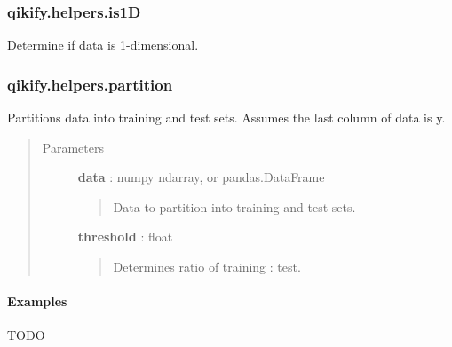 \documentclass[letterpaper,10pt,english]{sphinxmanual}
\begin{document}
\subsubsection{qikify.helpers.is1D}
\label{generated/qikify.helpers.is1D:qikify-helpers-is1d}\label{generated/qikify.helpers.is1D::doc}

\begin{fulllineitems}
\label{generated/qikify.helpers.is1D:qikify.helpers.is1D}
Determine if data is 1-dimensional.

\end{fulllineitems}



\subsubsection{qikify.helpers.partition}
\label{generated/qikify.helpers.partition:qikify-helpers-partition}\label{generated/qikify.helpers.partition::doc}

\begin{fulllineitems}
\label{generated/qikify.helpers.partition:qikify.helpers.partition}
Partitions data into training and test sets. Assumes the last column of
data is y.
\begin{quote}\begin{description}
\item[{Parameters }] \leavevmode
\textbf{data} : numpy ndarray, or pandas.DataFrame
\begin{quote}

Data to partition into training and test sets.
\end{quote}

\textbf{threshold} : float
\begin{quote}

Determines ratio of training : test.
\end{quote}

\end{description}\end{quote}
\paragraph{Examples}

TODO

\end{fulllineitems}
\end{document}
